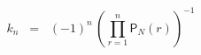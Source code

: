 \begin{equation}
k_n \;\; = \;\; {(-1)}^n \, {\left( \prod_{r=1}^n {\textsf{P}}_N (r) \right)}^{-1}
\label{eq:x12}
\end{equation}


